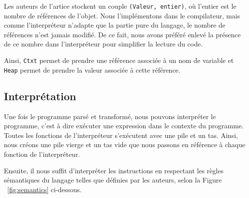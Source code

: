 \documentclass{rapportECL}
\begin{document}
Les auteurs de l'artice stockent un couple \verb|(Valeur, entier)|, où l'entier est le nombre de références de l'objet. Nous l'implémentons dans
le compilateur, mais comme l'interpréteur n'adapte que la partie pure du langage, le nombre de références n'est jamais modifié. De ce 
fait, nous avons préféré enlevé la présence de ce nombre dans l'interpréteur pour simplifier la lecture du code.

\medskip

Ainsi, \verb|Ctxt| permet de prendre une référence associée à un nom de variable et \verb|Heap| permet de prendre la valeur associée à cette référence.

\bigskip

\subsection{Interprétation}

Une fois le programme parsé et transformé, nous pouvons interpréter le programme, c'est à dire exécuter une expression dans le 
contexte du programme. Toutes les fonctions de l'interpréteur s'exécutent avec une pile et un tas. Ainsi, nous créons une pile vierge
et un tas vide que nous passons en référence à chaque fonction de l'interpréteur.

Ensuite, il nous suffit d'interpréter les instructions en respectant les règles sémantiques du langage telles que définies par les auteurs, 
selon la Figure ~\ref{fig:semantics} ci-dessous.
\end{document}
